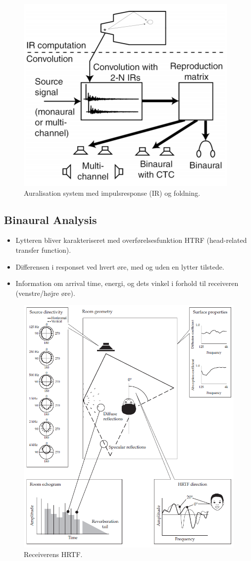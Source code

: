 \begin{figure} [H]
	\centering
	\includegraphics[width=.6\linewidth]{graphics/21.png}
	\caption{Auralisation system med impulsresponse (IR) og foldning.}
	\label{fig:21}
\end{figure}

\subsection{Binaural Analysis}
\begin{itemize}
	\item Lytteren bliver karakteriseret med overførelsesfunktion HTRF (head-related transfer function).
	\item Differensen i responset ved hvert øre, med og uden en lytter tilstede.
	\item Information om arrival time, energi, og dets vinkel i forhold til receiveren (venstre/højre øre).
\end{itemize}

\begin{figure} [H]
	\centering
	\includegraphics[width=\linewidth]{graphics/20.png}
	\caption{Receiverens HRTF.}
	\label{fig:20}
\end{figure}